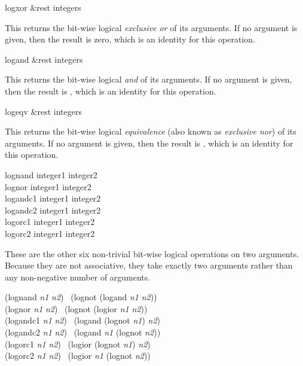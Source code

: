 \begin{defun}[Function]
logxor &rest integers

This returns the bit-wise logical {\it exclusive or} of its arguments.
If no argument is given, then the result is zero,
which is an identity for this operation.
\end{defun}

\begin{defun}[Function]
logand &rest integers

This returns the bit-wise logical {\it and} of its arguments.
If no argument is given, then the result is ,
which is an identity for this operation.
\end{defun}

\begin{defun}[Function]
logeqv &rest integers

This returns the bit-wise logical {\it equivalence} (also known as {\it exclusive nor})
of its arguments.
If no argument is given, then the result is ,
which is an identity for this operation.
\end{defun}

\begin{defun}[Function]
lognand integer1 integer2 \\
lognor integer1 integer2 \\
logandc1 integer1 integer2 \\
logandc2 integer1 integer2 \\
logorc1 integer1 integer2 \\
logorc2 integer1 integer2

These are the other six non-trivial bit-wise logical operations
on two arguments.  Because they are not associative,
they take exactly two arguments rather than any non-negative number
of arguments.
\begin{lisp}
(lognand {\it n1} {\it n2}) \EQ\ (lognot (logand {\it n1} {\it n2})) \\[2pt]
(lognor {\it n1} {\it n2}) \EQ\ (lognot (logior {\it n1} {\it n2})) \\[2pt]
(logandc1 {\it n1} {\it n2}) \EQ\ (logand (lognot {\it n1}) {\it n2}) \\[2pt]
(logandc2 {\it n1} {\it n2}) \EQ\ (logand {\it n1} (lognot {\it n2})) \\[2pt]
(logorc1 {\it n1} {\it n2}) \EQ\ (logior (lognot {\it n1}) {\it n2}) \\[2pt]
(logorc2 {\it n1} {\it n2}) \EQ\ (logior {\it n1} (lognot {\it n2}))
\end{lisp}
\end{defun}

